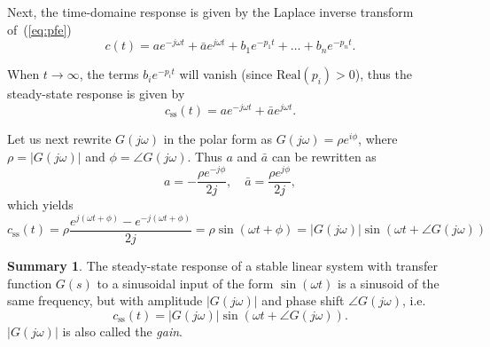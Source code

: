 \documentclass[a4paper,11pt]{report}
\theoremstyle{definition}
\newtheorem{mdsummary}{Summary}
\newenvironment{summary}%
  {\vspace{0.1cm}\begin{mdframed}[linecolor=red!60!black,
  linewidth=2pt]\begin{mdsummary}}%
  {\end{mdsummary}\end{mdframed}\vspace{0.1cm}}
\begin{document}
Next, the time-domaine response is given by the Laplace inverse
transform of~(\ref{eq:pfe})
\[
c(t) = a e^{-j\omega t} + \bar a e^{j\omega t} + b_1 e^{-p_1t} + \dots
+ b_n e^{-p_nt}.
\]

When $t\to \infty$, the terms $b_i e^{-p_it}$ will vanish (since
$\mathrm{Real}(p_i)>0$), thus the steady-state response is given by
\[
c_\mathrm{ss}(t) = a e^{-j\omega t} + \bar a e^{j\omega t}.
\]

Let us next rewrite $G(j\omega)$ in the polar form as $G(j\omega)=\rho
e^{i\phi}$, where $\rho = |G(j\omega)|$ and $\phi=\angle
G(j\omega)$.  Thus $a$ and $\bar a$ can be rewritten as
\[
a = -\frac{\rho e^{-j\phi}}{2j},\quad \bar a =\frac{\rho e^{j\phi}}{2j},
\]
which yields
\[
c_\mathrm{ss}(t) = \rho \frac{e^{j(\omega t+\phi)}-e^{-j(\omega
    t+\phi)}}{2j} = \rho \sin(\omega t + \phi)=
|G(j\omega)|\sin(\omega t +\angle G(j\omega))
\]

\begin{summary}
  \label{sum:fr}
  The steady-state response of a stable linear system with transfer
  function $G(s)$ to a sinusoidal input of the form $\sin(\omega t)$
  is a sinusoid of the same frequency, but with amplitude
  $|G(j\omega)|$ and phase shift $\angle G(j\omega)$, i.e.
  \[
  c_\mathrm{ss}(t) = |G(j\omega)|\sin\left(\omega t+\angle G(j\omega)\right).
  \]
  $|G(j\omega)|$ is also called the \emph{gain}.
\end{summary}
\end{document}

